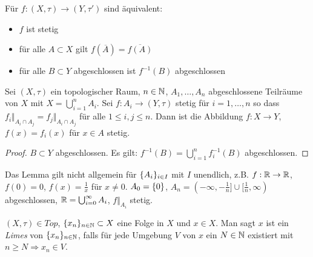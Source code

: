 \begin{stz}
    Für $f:(X,\tau)\to(Y,\tau')$ sind äquivalent:
    \begin{itemize}
        \item $f$ ist stetig
        \item für alle $A\subset X$ gilt $f(\overline{A}) = \overline{f(A)}$
        \item für alle $B\subset Y$ abgeschlossen ist $f^{-1}(B)$ abgeschlossen
    \end{itemize}
\end{stz}

\begin{lem}
    Sei $(X,\tau)$ ein topologischer Raum, $n\in\mathbb{N}$, $A_1,\ldots,A_n$ abgeschlossene
    Teilräume von $X$ mit $X=\bigcup_{i=1}^n A_i$. Sei $f:A_i\to(Y,\tau)$ stetig
    für $i = 1, \ldots, n$ so dass $f_i\Vert_{A_i\cap A_j}=f_j\Vert_{A_i\cap A_j}$
    für alle $1\leq i, j \leq n$. Dann ist die Abbildung $f : X \to Y$, $f(x) = f_i(x)$
    für $x\in A$ stetig.
    \begin{proof}
        $B\subset Y$ abgeschlossen. Es gilt: $f^{-1}(B) = \bigcup_{i=1}^n f^{-1}_i(B)$
        abgeschlossen.
    \end{proof}
    \begin{bem}
        Das Lemma gilt nicht allgemein für $\mdef{A_i}_{i\in I}$ mit $I$ unendlich,
        z.B. $f:\mathbb{R}\to\mathbb{R}$, $f(0) = 0$, $f(x) = \frac{1}{x}$ für $x\neq 0$.
        $A_0 = \mdef{0}$, $A_n = (-\infty,-\frac 1n]\cup[\frac 1n, \infty)$
        abgeschlossen, $\mathbb{R}=\bigcup_{i=0}^\infty A_i$, $f\Vert_{A_i}$ stetig.
    \end{bem}
\end{lem}

\begin{dfn}
    $(X,\tau)\in Top$, $\mdef{x_n}_{n\in\N}\subset X$ eine Folge in $X$ und $x\in X$.
    Man sagt $x$ ist ein \emph{Limes} von $\mdef{x_n}_{n\in\N}$, falls für jede
    Umgebung $V$ von $x$ ein $N\in\mathbb{N}$ existiert mit $n\geq N\Rightarrow x_n\in V$.
\end{dfn}

